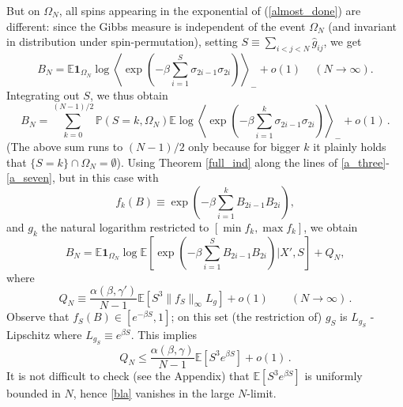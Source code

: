 \documentclass[a4paper,12pt,oneside,reqno]{amsart}
\numberwithin{equation}{section}
\begin{document}
But on $\Omega_N$, all spins appearing in the exponential of (\ref{almost_done}) are different: since the Gibbs measure is independent of the event $\Omega_N$ (and invariant in distribution under spin-permutation), setting $S {\equiv} \sum\limits_{i<j<N} \hat{g}_{ij}$, we get
\begin{equation}
B_N = {{\mathbb{E}}} \boldsymbol{1}_{\Omega_N}\log \left< \exp\left( -  {\beta} \sum\limits_{i=1}^S {\sigma}_{2i-1} {\sigma}_{2i} \right) \right>_-  + o(1)\,\quad (N\to \infty).
\end{equation}
Integrating out $S$, we thus obtain
\begin{equation}
B_N = \sum\limits_{k=0}^{(N-1)/2}{\mathbb{P}}(S=k,\Omega_N) {{\mathbb{E}}} \log \left< \exp\left( -  {\beta} \sum\limits_{i=1}^k {\sigma}_{2i-1} {\sigma}_{2i} \right) \right>_-  + o(1)\,.
\end{equation}
(The above sum runs to $(N-1)/2$ only because for bigger $k$ it plainly holds that $\{S=k\} \cap \Omega_N = \emptyset$). Using Theorem \ref{full_ind} along the lines of \eqref{a_three}-\eqref{a_seven}, but in this case with 
\[
f_k(B) {\equiv}  \exp\left( -  {\beta} \sum\limits_{i=1}^k B_{2i-1} B_{2i} \right),
\]
and $g_k$ the natural logarithm restricted to $\left[ \min f_k, \max f_k\right]$, we obtain
\begin{equation}\label{b_onlydetailsleft}
B_N = {{\mathbb{E}}} \boldsymbol{1}_{\Omega_N} \log {{\mathbb{E}}}\left[ \exp\left( -  {\beta} \sum\limits_{i=1}^S B_{2i-1} B_{2i} \right)|X',S \right]  + Q_N, 
\end{equation}
where 
\[
Q_N {\equiv} \frac{\alpha(\beta,\gamma')}{N-1} {{\mathbb{E}}}\left[ S^3\|f_S\|_\infty L_g \right] + o(1) \qquad (N\to \infty)\,.
\]
Observe that $f_S(B) \in [e^{-\beta S}, 1]$; on this set (the restriction of) $g_S$ is $L_{g_S}$ -Lipschitz where $L_{g_S} {\equiv} e^{\beta S}$. This implies 
\begin{equation} \label{bla}
Q_N \leq 
\frac{\alpha(\beta,\gamma)}{N-1} {{\mathbb{E}}}\left[ S^3 e^{\beta S}\right]+o(1)\,.
\end{equation}
It is not difficult to check (see the Appendix) that ${{\mathbb{E}}}\left[ S^3 e^{\beta S}\right]$ is uniformly bounded in $N$,  
hence \eqref{bla} vanishes in the large $N$-limit. 
\end{document}
